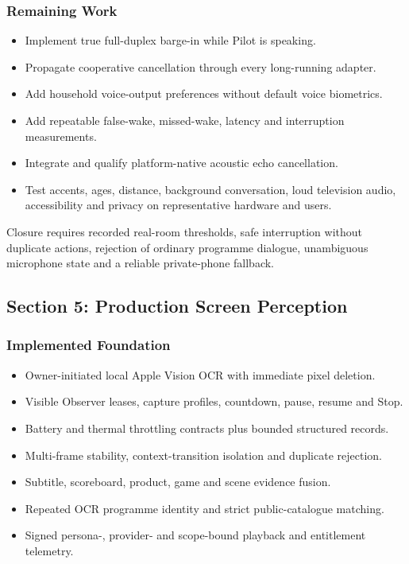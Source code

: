 \subsubsection{Remaining Work}

\begin{itemize}
  \item Implement true full-duplex barge-in while Pilot is speaking.
  \item Propagate cooperative cancellation through every long-running adapter.
  \item Add household voice-output preferences without default voice biometrics.
  \item Add repeatable false-wake, missed-wake, latency and interruption measurements.
  \item Integrate and qualify platform-native acoustic echo cancellation.
  \item Test accents, ages, distance, background conversation, loud television audio,
        accessibility and privacy on representative hardware and users.
\end{itemize}

Closure requires recorded real-room thresholds, safe interruption without duplicate
actions, rejection of ordinary programme dialogue, unambiguous microphone state and
a reliable private-phone fallback.

\subsection{Section 5: Production Screen Perception}

\subsubsection{Implemented Foundation}

\begin{itemize}
  \item Owner-initiated local Apple Vision OCR with immediate pixel deletion.
  \item Visible Observer leases, capture profiles, countdown, pause, resume and Stop.
  \item Battery and thermal throttling contracts plus bounded structured records.
  \item Multi-frame stability, context-transition isolation and duplicate rejection.
  \item Subtitle, scoreboard, product, game and scene evidence fusion.
  \item Repeated OCR programme identity and strict public-catalogue matching.
  \item Signed persona-, provider- and scope-bound playback and entitlement telemetry.
\end{itemize}

